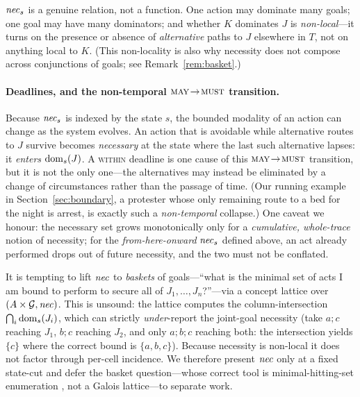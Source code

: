 \begin{remark}
$\mathit{nec}_s$ is a genuine relation, not a function. One action may dominate many goals; one
goal may have many dominators; and whether $K$ dominates $J$ is \emph{non-local}---it
turns on the presence or absence of \emph{alternative} paths to $J$ elsewhere in $T$,
not on anything local to $K$. (This non-locality is also why necessity does not compose
across conjunctions of goals; see Remark~\ref{rem:basket}.)
\end{remark}

\paragraph{Deadlines, and the non-temporal $\textsc{may}\!\to\!\textsc{must}$ transition.}
Because $\mathit{nec}_s$ is indexed by the state $s$, the bounded modality of an action can
change as the system evolves. An action that is avoidable while alternative routes to
$J$ survive becomes \emph{necessary} at the state where the last such alternative lapses:
it \emph{enters} $\operatorname{dom}_s(J)$. A \textsc{within} deadline is one cause of this
$\textsc{may}\!\to\!\textsc{must}$ transition, but it is not the only one---the alternatives may instead
be eliminated by a change of circumstances rather than the passage of time. (Our running
example in Section~\ref{sec:boundary}, a protester whose only remaining route to a bed
for the night is arrest, is exactly such a \emph{non-temporal} collapse.) One caveat we
honour: the necessary set grows monotonically only for a \emph{cumulative, whole-trace}
notion of necessity; for the \emph{from-here-onward} $\mathit{nec}_s$ defined above, an act
already performed drops out of future necessity, and the two must not be conflated.

\begin{remark}
\label{rem:basket}
It is tempting to lift $\mathit{nec}$ to \emph{baskets} of goals---``what is the minimal set of
acts I am bound to perform to secure all of $J_1,\dots,J_n$?''---via a concept lattice
over $(A\times\mathcal{G},\mathit{nec})$. This is unsound: the lattice computes the
column-intersection $\bigcap_i \operatorname{dom}_s(J_i)$, which can strictly \emph{under}-report the
joint-goal necessity (take $a;c$ reaching $J_1$, $b;c$ reaching $J_2$, and only $a;b;c$
reaching both: the intersection yields $\{c\}$ where the correct bound is $\{a,b,c\}$).
Because necessity is non-local it does not factor through per-cell incidence. We
therefore present $\mathit{nec}$ only at a fixed state-cut and defer the basket question---whose
correct tool is minimal-hitting-set enumeration , not a Galois
lattice---to separate work.
\end{remark}

